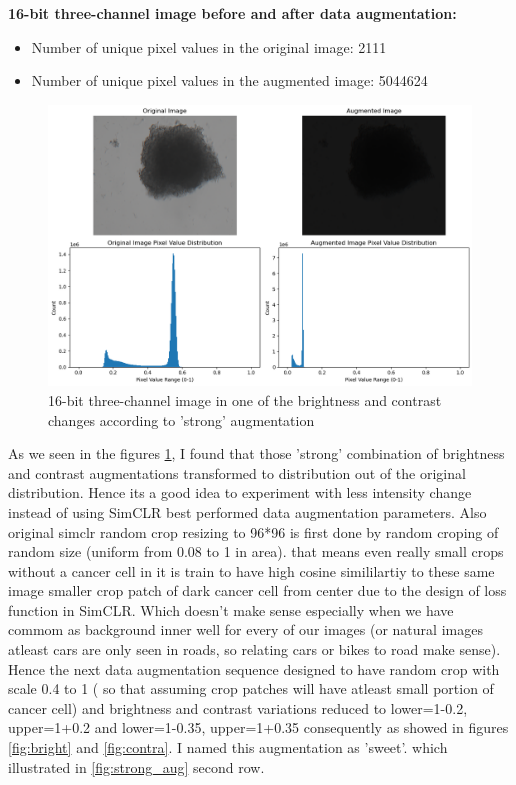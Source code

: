   \textbf{16-bit three-channel image before and after data augmentation:}
  \begin{itemize}
    \item Number of unique pixel values in the original image: 2111
    \item Number of unique pixel values in the augmented image: 5044624
  \end{itemize}
  
  \begin{figure}[H]
    \centering
    \includegraphics[scale=0.5]{figures/16bit_three_1.png} 
    \caption{16-bit three-channel image in one of the brightness and contrast changes according to 'strong' augmentation}
    \label{fig:16bit_three_v1}
  \end{figure}
   

As we seen in the figures  \ref{fig:16bit_three_v1}, I found that those 'strong' combination of  brightness and contrast augmentations transformed to distribution out of the original distribution. Hence its a good idea to experiment with less intensity change instead of using SimCLR best performed data augmentation parameters. Also original simclr random crop resizing to 96*96 is first done by random croping of random size (uniform from 0.08 to 1 in area). that means even really small crops without a cancer cell in it is train to have high cosine simililartiy to these same image smaller crop patch of dark cancer cell from center due to the design
 of  loss function in SimCLR. Which doesn't make sense especially when we have commom as background inner well for every of our images (or natural images atleast cars are only seen in roads, so 
 relating cars or bikes to road make sense). Hence the next data augmentation sequence designed to have random crop with scale 0.4 to 1 ( so that 
 assuming crop patches will have atleast small portion of cancer cell) and brightness and contrast variations reduced to lower=1-0.2, upper=1+0.2 and lower=1-0.35,
  upper=1+0.35 consequently as showed in figures  \ref{fig:bright} and  \ref{fig:contra}. I named this augmentation as 'sweet'. which illustrated in \ref{fig:strong_aug} second row.

